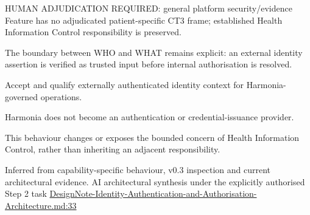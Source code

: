 HUMAN ADJUDICATION REQUIRED: general platform security/\allowbreak{}evidence Feature has no adjudicated patient-specific CT3 frame; established Health Information Control responsibility is preserved.



The boundary between WHO and WHAT remains explicit: an external identity assertion is verified as trusted input before internal authorisation is resolved.



Accept and qualify externally authenticated identity context for Harmonia-governed operations.



Harmonia does not become an authentication or credential-issuance provider.



This behaviour changes or exposes the bounded concern of Health Information Control, rather than inheriting an adjacent responsibility.


Inferred from capability-specific behaviour, v0.3 inspection and current architectural evidence. AI architectural synthesis under the explicitly authorised Step 2 task \hyperref[evidence:13afd583ac468df7]{DesignNote-Identity-Authentication-and-Authorisation-Architecture.md:33}
